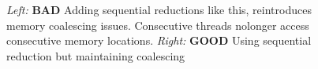 \begin{figure}
\begin{minipage}{0.45\linewidth}
\begin{tikzpicture}[scale = 0.40]







\end{tikzpicture} 
\end{minipage}

\caption{\emph{Left:} \textbf{BAD} Adding sequential reductions like this, reintroduces memory coalescing issues. Consecutive threads nolonger access consecutive memory locations.\newline
\emph{Right:} \textbf{GOOD} Using sequential reduction but maintaining coalescing} 

\label{fig:redSeq}
\end{figure} 
